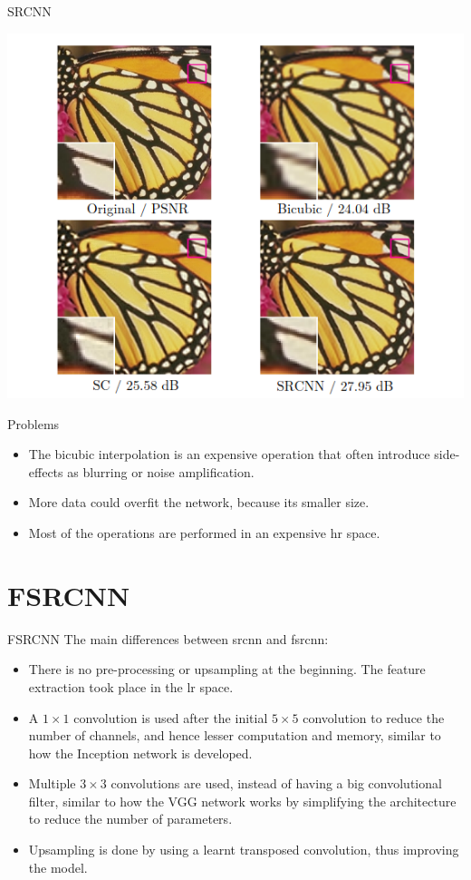 \documentclass[hyperref={unicode}, xcolor=dvipsnames, t]{beamer}
\begin{document}
\begin{frame}{SRCNN}
\begin{center}
{            \includegraphics[height=0.9\textheight]{figures/example.png}
        }
    \end{center}
\end{frame}

\begin{frame}{Problems}
    \begin{itemize}
        \item The \alert{bicubic interpolation} is an expensive operation that often introduce side-effects as blurring or noise amplification.
        \item More data could \alert{overfit} the network, because its smaller size.
        \item Most of the operations are performed in an expensive \alert{\gls{hr}} space.
    \end{itemize}
\end{frame}

\section{FSRCNN}
\begin{frame}{FSRCNN}
    The main differences between \gls{srcnn} and \gls{fsrcnn}:
    \begin{itemize}
        \item There is no pre-processing or upsampling at the beginning. The feature extraction took place in the \alert{\gls{lr} space}.
        \item A $1\times1$ convolution is used after the initial $5\times5$ convolution to reduce the number of channels, and hence lesser computation and memory, similar to how the Inception\cite{inception} network is developed.
        \item Multiple $3\times3$ convolutions are used, instead of having a big convolutional filter, similar to how the VGG network works by simplifying the architecture to reduce the number of parameters.
        \item Upsampling is done by using a learnt transposed convolution, thus improving the model.
    \end{itemize}
\end{frame}
\end{document}
